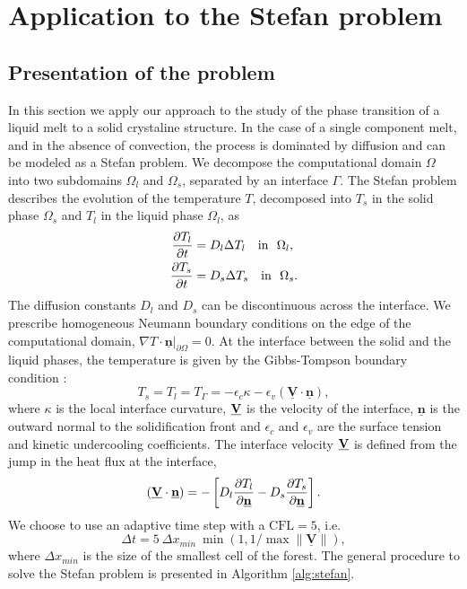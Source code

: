 \section{Application to the Stefan problem} \label{sec:application}

\subsection{Presentation of the problem}

In this section we apply our approach to the study of the phase transition of a liquid melt to a solid crystaline structure. In the case of a single component melt, and in the absence of convection, the process is dominated by diffusion and can be modeled as a Stefan problem. We decompose the computational domain $\Omega$ into two subdomains $\Omega_l$ and $\Omega_s$, separated by an interface $\Gamma$. The Stefan problem describes the evolution of the temperature $T$, decomposed into $T_s$ in the solid phase $\Omega_s$ and $T_l$ in the liquid phase $\Omega_l$, as
\begin{align}
\frac{\partial T_l}{\partial t} & = D_l \Delta T_l \quad \mathrm{in} ~~ \Omega_l, \label{eq:stefan_heat_equation_l} \\
\frac{\partial T_s}{\partial t} & = D_s \Delta T_s \quad \mathrm{in} ~~ \Omega_s. \label{eq:stefan_heat_equation_s}
\end{align}
The diffusion constants $D_l$ and $D_s$ can be discontinuous across the interface. We prescribe homogeneous Neumann boundary conditions on the edge of the computational domain, $\nabla T \cdot \underline{\mathbf{n}}\vert_{\partial \Omega}=0$. At the interface between the solid and the liquid phases, the temperature is given by the Gibbs-Tompson boundary condition \cite{Alexiades;Solomon;Wilson:88:The-formation-of-a-s, Alexiades;Solomon:93:Mathematical-Modelin}:
\begin{equation} \label{eq:stefan_gibbs_tompson}
T_s = T_l = T_{\Gamma} = -\epsilon_c \kappa - \epsilon_v (\underline{\mathbf{V}} \cdot \underline{\mathbf{n}}),
\end{equation}
where $\kappa$ is the local interface curvature, $\underline{\mathbf{V}}$ is the velocity of the interface, $\underline{\mathbf{n}}$ is the outward normal to the solidification front and $\epsilon_c$ and $\epsilon_v$ are the surface tension and kinetic undercooling coefficients. The interface velocity $\underline{\mathbf{V}}$ is defined from the jump in the heat flux at the interface,
\begin{equation} \label{eq:stefan_velocity}
(\underline{\mathbf{V}} \cdot \underline{\mathbf{n}}) = - \left[ D_l \frac{\partial T_l}{\partial \underline{\mathbf{n}}} - D_s \frac{\partial T_s}{\partial \underline{\mathbf{n}}} \right].
\end{equation}
We choose to use an adaptive time step with a $\text{CFL} = 5$, i.e.
\begin{equation} \label{eq:stefan_dt}
\Delta t = 5 ~ \Delta x_{min} ~ \min(1,1/\max \lVert \underline{\mathbf{V}} \rVert),
\end{equation}
where $\Delta x_{min}$ is the size of the smallest cell of the forest. The general procedure to solve the Stefan problem is presented in Algorithm \ref{alg:stefan}.

